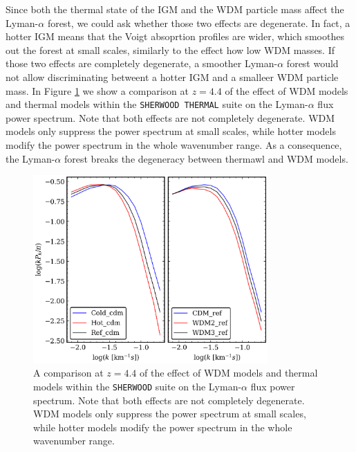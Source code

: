 Since both the thermal state of the IGM and the WDM particle mass affect the Lyman-$\alpha$ forest, we could ask whether those two effects are degenerate. In fact, a hotter IGM means that the Voigt absoprtion profiles are wider, which smoothes out the forest at small scales, similarly to the effect how low WDM masses. If those two effects are completely degenerate, a smoother Lyman-$\alpha$ forest would not allow discriminating betweent a hotter IGM and a smalleer WDM particle mass. In Figure \ref{fig: PS thermal vs WDM} we show a comparison at $z=4.4$ of the effect of WDM models and thermal models within the \texttt{SHERWOOD THERMAL} suite on the Lyman-$\alpha$ flux power spectrum. Note that both effects are not completely degenerate. WDM models only suppress the power spectrum at small scales, while hotter models modify the power spectrum in the whole wavenumber range. As a consequence, the Lyman-$\alpha$ forest breaks the degeneracy between thermawl and WDM models.

\begin{figure}[h]
        \centering
            \includegraphics[width=0.8\textwidth]{img/ML/PS_thermal_vs_wdm.png}
            \caption{A comparison at $z=4.4$ of the effect of WDM models and thermal models within the \texttt{SHERWOOD} suite on the Lyman-$\alpha$ flux power spectrum. Note that both effects are not completely degenerate. WDM models only suppress the power spectrum at small scales, while hotter models modify the power spectrum in the whole wavenumber range.}
            \label{fig: PS thermal vs WDM}
\end{figure}   




